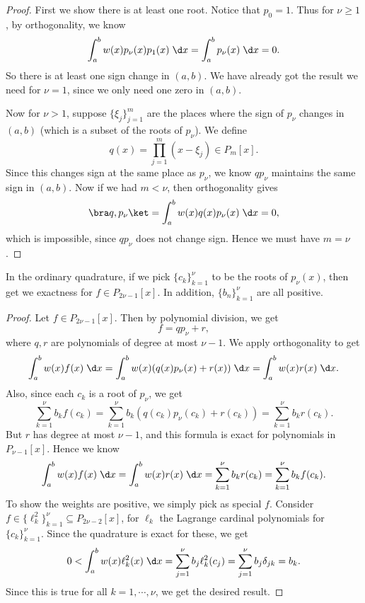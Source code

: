 \documentclass[a4paper]{article}
\begin{document}
\begin{proof}
  First we show there is at least one root. Notice that $p_0 = 1$. Thus for $\nu \geq 1$, by orthogonality, we know
  \[
    \int_a^b w(x) p_\nu(x) p_1(x)\;\d x = \int_a^b p_\nu(x)\;\d x = 0.
  \]
  So there is at least one sign change in $(a, b)$. We have already got the result we need for $\nu = 1$, since we only need one zero in $(a, b)$.

  Now for $\nu > 1$, suppose $\{\xi_j\}_{j = 1}^m$ are the places where the sign of $p_\nu$ changes in $(a, b)$ (which is a subset of the roots of $p_\nu$). We define
  \[
    q(x) = \prod_{j = 1}^m (x - \xi_j) \in P_m[x].
  \]
  Since this changes sign at the same place as $p_\nu$, we know $q p_\nu$ maintains the same sign in $(a, b)$. Now if we had $m < \nu$, then orthogonality gives
  \[
    \bra q, p_\nu\ket = \int_a^b w(x)q(x) p_\nu(x)\;\d x = 0,
  \]
  which is impossible, since $qp_\nu$ does not change sign. Hence we must have $m = \nu$.
\end{proof}

\begin{thm}
  In the ordinary quadrature, if we pick $\{c_k\}_{k = 1}^\nu$ to be the roots of $p_\nu(x)$, then get we exactness for $f \in P_{2\nu - 1}[x]$. In addition, $\{b_n\}_{k = 1}^\nu$ are all positive.
\end{thm}

\begin{proof}
  Let $f \in P_{2 \nu - 1}[x]$. Then by polynomial division, we get
  \[
    f = qp_\nu + r,
  \]
  where $q, r$ are polynomials of degree at most $\nu - 1$. We apply orthogonality to get
  \[
    \int_a^b w(x) f(x)\;\d x = \int_a^b w(x) (q(x) p_\nu(x) + r(x)) \;\d x= \int_a^b w(x) r(x)\;\d x.
  \]
  Also, since each $c_k$ is a root of $p_\nu$, we get
  \[
    \sum_{k = 1}^\nu b_k f(c_k) = \sum_{k = 1}^\nu b_k (q(c_k) p_\nu(c_k) + r(c_k)) = \sum_{k = 1}^\nu b_k r(c_k).
  \]
  But $r$ has degree at most $\nu - 1$, and this formula is exact for polynomials in $P_{\nu - 1}[x]$. Hence we know
  \[
    \int_a^b w(x) f(x)\;\d x = \int_a^b w(x) r(x)\;\d x = \sum_{k = 1}^\nu b_k r(c_k) = \sum_{k = 1}^\nu b_k f(c_k).
  \]
  To show the weights are positive, we simply pick as special $f$. Consider $f \in \{\ell_k^2\}_{k = 1}^\nu \subseteq P_{2\nu - 2}[x]$, for $\ell_k$ the Lagrange cardinal polynomials for $\{c_k\}_{k = 1}^\nu$. Since the quadrature is exact for these, we get
  \[
    0 < \int_a^b w(x)\ell_k^2(x)\;\d x = \sum_{j = 1}^\nu b_j \ell_k^2(c_j) = \sum_{j = 1}^\nu b_j \delta_{jk} = b_k.
  \]
  Since this is true for all $k = 1, \cdots, \nu$, we get the desired result.
\end{proof}
\end{document}
